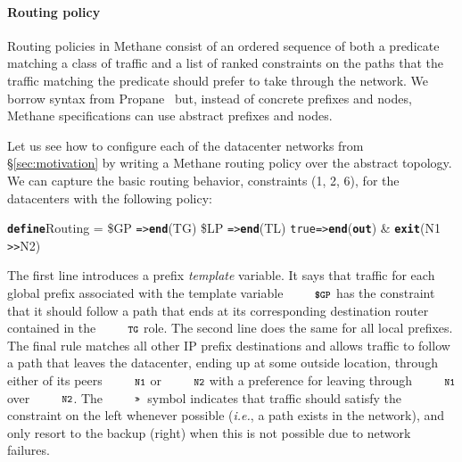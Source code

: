 \documentclass[numbers, 10pt, preprint]{sigplanconf}
\newcommand{\IE}{\emph{i.e.}}
\newcommand{\sysname}{{\small \sf Methane}\xspace}
\newcommand{\para}[1]{\paragraph*{\textbf{#1}}}
\newcommand{\CD}[1]{\texttt{\small #1}}  %
\newcommand{\KW}[1]{\texttt{\small\bfseries{#1}}}
\newcommand{\True}{\CD{true}}
\newcommand{\Define}{\KW{define}}
\newcommand{\Prefer}{\texttt{>>}}
\newcommand{\Path}{\texttt{=>}}
\newcommand{\Out}{\KW{out}}
\newcommand{\Exit}{\KW{exit}}
\newcommand{\End}{\KW{end}}
\begin{document}
%


\para{Routing policy} Routing policies in \sysname consist of an ordered sequence of both a predicate matching a class of traffic and a list of ranked constraints on the paths that the traffic matching the predicate should prefer to take through the network. We borrow syntax from Propane~\cite{propane} but, instead of concrete prefixes and nodes, \sysname specifications can use abstract prefixes and nodes.

Let us see how to configure each of the datacenter networks from \S\ref{sec:motivation} by writing a \sysname routing policy over the abstract topology. We can capture the basic routing behavior, constraints (1, 2, 6), for the datacenters with the following policy:
%
\begin{code}
\Define Routing =
    \$GP  \Path \End(TG)
    \$LP  \Path \End(TL)
    \True \Path \End(\Out) & \Exit(N1 \Prefer N2)
\end{code}
\noindent%

The first line introduces a prefix \emph{template} variable. It says that traffic for each global prefix associated with the template variable $\CD{\$GP}$ has the constraint that it should follow a path that ends at its corresponding destination router contained in the $\CD{TG}$ role. The second line does the same for all local prefixes.
%
The final rule matches all other IP prefix destinations and allows traffic to follow a path that leaves the datacenter, ending up at some outside location, through either of its peers $\CD{N1}$ or $\CD{N2}$ with a preference for leaving through $\CD{N1}$ over $\CD{N2}$. The $\CD{\Prefer}$~symbol indicates that traffic should satisfy the constraint on the left whenever possible (\IE, a path exists in the network), and only resort to the backup (right) when this is not possible due to network failures.%
\end{document}
